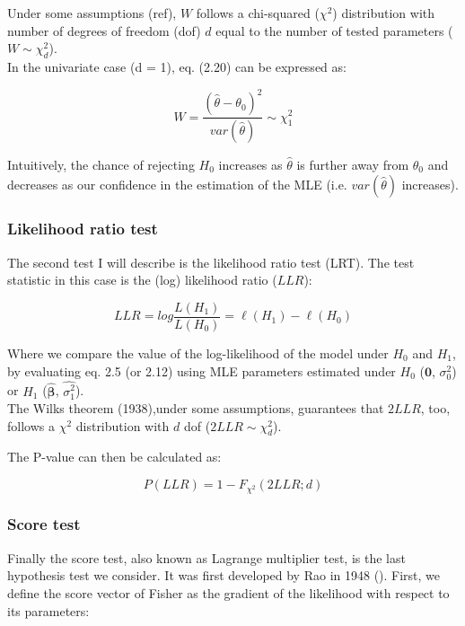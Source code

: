 Under some assumptions (ref), $W$ follows a chi-squared ($\chi^2$) distribution with number of degrees of freedom (dof) $d$ equal to the number of tested parameters ($W \sim \chi^2_d $).\\

In the univariate case (d = 1), eq. (2.20) can be expressed as:

\begin{equation}
    W = \frac{(\hat{\theta}-\theta_0)^2}{var(\hat{\theta})} \sim \chi^2_1
\end{equation}

Intuitively, the chance of rejecting $H_0$ increases as $\hat{\theta}$ is further away from $\theta_0$
and decreases as our confidence in the estimation of the MLE (i.e. $var(\hat{\theta})$ increases).


\subsubsection{Likelihood ratio test}

The second test I will describe is the likelihood ratio test (LRT).
The test statistic in this case is the (log) likelihood ratio ($LLR$):

\begin{equation}\label{eq18:log_likelihood_ratio}
LLR = log \frac{L(H_1)}{L(H_0)} = \ell(H_1) - \ell(H_0) 
\end{equation}

Where we compare the value of the log-likelihood of the model under $H_0$ and $H_1$, by evaluating eq. 2.5 (or 2.12) using MLE parameters estimated under $H_0$ ($\mathbf{0}$, $\sigma_0^2$) or $H_1$ ($\hat{\boldsymbol{\beta}}$, $\hat{\sigma_1^2}$).  \\

The Wilks theorem (1938),under some assumptions, guarantees that $2LLR$, too, follows a $\chi^2$ distribution with $d$ dof ($2LLR \sim \chi^2_d$).

The P-value can then be calculated as:

\begin{equation}
    P(LLR) = 1-F_{\chi^2}(2LLR; d)
\end{equation}

\subsubsection{Score test}

Finally the score test, also known as Lagrange multiplier test, is the last hypothesis test we consider. 
It was first developed by Rao in 1948 (\cite{rao1948large}).
First, we define the score vector of Fisher as the gradient of the likelihood with respect to its parameters:

